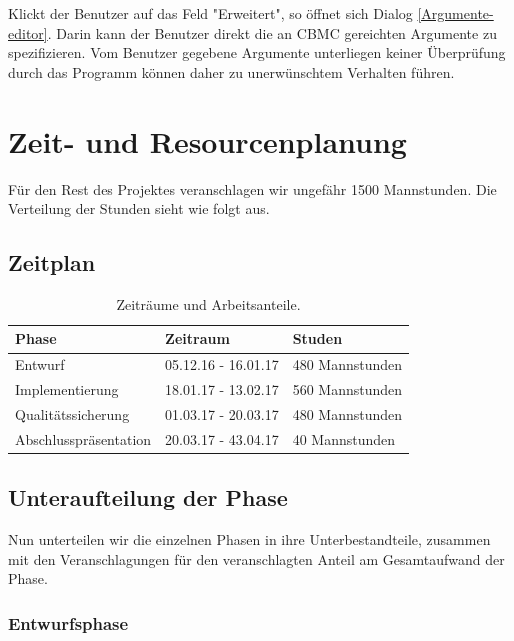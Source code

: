 \documentclass[a4paper]{scrreprt}
\begin{document}
Klickt der \gls{Benutzer} auf das Feld "Erweitert", so öffnet sich Dialog \ref{Argumente-editor}. Darin kann der \gls{Benutzer} direkt die an \ac{CBMC} gereichten Argumente zu spezifizieren. Vom \gls{Benutzer} gegebene Argumente unterliegen keiner Überprüfung durch das Programm können daher zu unerwünschtem Verhalten führen.

\chapter{Zeit- und Resourcenplanung}

Für den Rest des Projektes veranschlagen wir ungefähr 1500 Mannstunden. Die Verteilung der Stunden sieht wie folgt aus.

\section{Zeitplan}

\begin{table}[H]
\centering
  \begin{tabular}{|p{3cm}|P{2cm}|P{2cm}|}
    Phase & Zeitraum & Studen \\ \hline
    Entwurf & 05.12.16 - 16.01.17 & 480 Mannstunden \\ \hline
    Implementierung & 18.01.17 - 13.02.17 & 560 Mannstunden \\ \hline
    Qualitätssicherung & 01.03.17 - 20.03.17 & 480 Mannstunden \\
	Abschlusspräsentation & 20.03.17 - 43.04.17 & 40 Mannstunden \\
  \end{tabular}
  \newline\newline
  \caption{Zeiträume und Arbeitsanteile.}\label{tab1}
\end{table}


\section{Unteraufteilung der Phase}
Nun unterteilen wir die einzelnen Phasen in ihre Unterbestandteile, zusammen mit den Veranschlagungen für den veranschlagten Anteil am Gesamtaufwand der Phase.

\subsection{Entwurfsphase}
\end{document}
